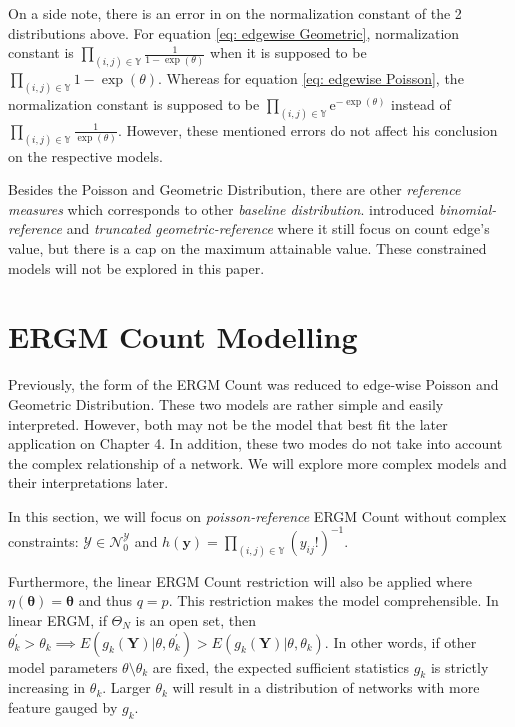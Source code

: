 \documentclass[12pt,a4paper,twoside,openany]{book}\usepackage[]{graphicx}\usepackage[]{color}
\newcommand{\me}{\mathrm{e}}
\begin{document}
On a side note, there is an error in \citet{countergmdefined} on the normalization constant of the 2 distributions above. 
For equation \ref{eq: edgewise Geometric}, \citet{countergmdefined} normalization constant is $\prod_{(i,j) \in \mathbb{Y}}\frac{1}{1-\exp(\theta)}$ when it is supposed to be  $\prod_{(i,j) \in \mathbb{Y}}1-\exp(\theta)$.
Whereas for equation \ref{eq: edgewise Poisson}, the normalization constant is supposed to be $\prod_{(i,j) \in \mathbb{Y}} \me^{-\exp(\theta)}$ instead of $\prod_{(i,j) \in \mathbb{Y}}\frac{1}{\exp(\theta)}$. 
However, these mentioned errors do not affect his conclusion on the respective models.

Besides the Poisson and Geometric Distribution, there are other \textit{reference measures} which corresponds to other \textit{baseline distribution}.
\citet{countergmapplied} introduced \textit{binomial-reference} and \textit{truncated geometric-reference} where it still focus on count edge's value, but there is a cap on the maximum attainable value.  
These constrained models will not  be explored in this paper.

\section{ERGM Count Modelling}
Previously, the form of the ERGM Count was reduced to edge-wise Poisson and Geometric Distribution. 
These two models are rather simple and easily interpreted. 
However, both may not be the model that best fit the later application on Chapter 4.
In addition, these two modes do not take into account the complex relationship of a network.
We will explore more complex models and their interpretations later.

In this section, we will focus on \textit{poisson-reference} ERGM Count without complex constraints: $\mathcal{Y} \in \mathcal{N}_0^{\mathcal{Y}}$ and $h(\bm{y}) = \prod_{(i,j) \in \mathbb{Y}}(y_{ij}!)^{-1}$. 

Furthermore, the linear ERGM Count restriction will also be applied where $\eta(\bm{\theta}) = \bm{\theta}$ and thus $q = p$. 
This restriction makes the model comprehensible. 
In linear ERGM, if $\Theta_{N}$ is an open set, then $\theta_{k}^{\prime} >\theta_{k} \implies E(g_k(\bm{Y})|\theta,\theta_k^{\prime})>E(g_k(\bm{Y})|\theta,\theta_k)$. 
In other words, if other model parameters $\theta \setminus \theta_k$ are fixed, the expected sufficient statistics $g_k$ is strictly increasing in $\theta_k$.
Larger $\theta_k$ will result in a distribution of networks with more feature gauged by $g_k$.
\end{document}
